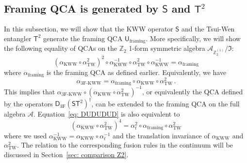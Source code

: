 \documentclass[aps,twocolumn,prx,floatfix,preprintnumbers, nofootinbib,10pt]{revtex4-2}
\numberwithin{equation}{section}
\theoremstyle{definition}
\theoremstyle{remark}
\theoremstyle{claim}
\newcommand{\be}{\begin{equation}}
\newcommand{\ee}{\end{equation}}
\newcommand{\aKWW}{\alpha_\text{KWW}}
\newcommand{\aTW}{\alpha_\text{TW}}
\newcommand{\athreeF}{\alpha_\text{3F-KWW}}
\renewcommand{\sf}[1]{\mathsf{#1}}
\newcommand{\paren}[1]{\left( #1 \right)}
\begin{document}
\subsection{Framing QCA is generated by $\mathsf{S}$ and $\sf{T}^2$}
\label{sec: Symmetry generated by D and U}
In this subsection, we will show that the KWW operator $\mathsf{S}$ and the Tsui-Wen entangler $\sf{T}^2$ generate the framing QCA $\sf{U}_{\text{framing}}$.
More specifically, we will show the following equality of QCAs on the $\mathbb{Z}_2$ 1-form symmetric algebra $\mathcal{A}_{\mathbb{Z}_2^{(1)}} / \mathfrak{I}$:
\be\label{eq: DUDUDUD}
\paren{\aKWW \circ \aTW^2}^2 \circ \aKWW^{-1} \circ \aTW^2 \circ \aKWW^{-1} = \alpha_\text{framing}
\ee
where $\alpha_\text{framing}$ is the framing QCA as defined earlier.
Equivalently, we have
\begin{equation}
\athreeF = \alpha_{\text{framing}} \circ \aKWW \circ \aTW^2 \,.
\end{equation}
This implies that $\athreeF \circ (\aKWW \circ \aTW^2)^{-1}$, or equivalently the QCA defined by the operators $\mathsf{D}_\text{3F}(\mathsf{S} \sf{T}^2)^{\dagger}$, can be extended to the framing QCA on the full algebra $\mathcal{A}$. Equation~\eqref{eq: DUDUDUD} is also equivalent to
\begin{equation}\label{eq: DU4 lattice}
 \paren{\aKWW \circ \aTW^2}^4 = \alpha_t^2 \circ \alpha_\text{framing} \circ \aTW^2
\end{equation}
where we used $\aKWW^{-1} = \aKWW \circ \alpha_t^{-1}$ and the translation invariance of $\aKWW$ and $\aTW^2$.
The relation to the corresponding fusion rules in the continuum will be discussed in Section~\ref{sec: comparison Z2}.
\end{document}
